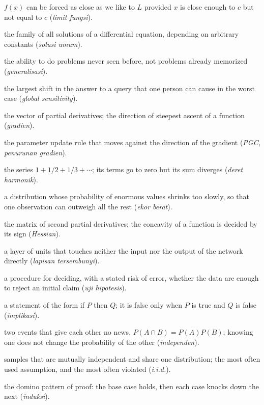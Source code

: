 \begin{description}[style=nextline,itemsep=0.35em]
  \item[Functional limit] $f(x)$ can be forced as close as we like to $L$ provided $x$ is close enough to $c$ but not equal to $c$ (\emph{limit fungsi}).
  \item[General solution] the family of all solutions of a differential equation, depending on arbitrary constants (\emph{solusi umum}).
  \item[Generalization] the ability to do problems never seen before, not problems already memorized (\emph{generalisasi}).
  \item[Global sensitivity] the largest shift in the answer to a query that one person can cause in the worst case (\emph{global sensitivity}).
  \item[Gradient] the vector of partial derivatives; the direction of steepest ascent of a function (\emph{gradien}).
  \item[Gradient descent] the parameter update rule that moves against the direction of the gradient (\emph{PGC, penurunan gradien}).
  \item[Harmonic series] the series $1+1/2+1/3+\cdots$; its terms go to zero but its sum diverges (\emph{deret harmonik}).
  \item[Heavy tail] a distribution whose probability of enormous values shrinks too slowly, so that one observation can outweigh all the rest (\emph{ekor berat}).
  \item[Hessian] the matrix of second partial derivatives; the concavity of a function is decided by its sign (\emph{Hessian}).
  \item[Hidden layer] a layer of units that touches neither the input nor the output of the network directly (\emph{lapisan tersembunyi}).
  \item[Hypothesis test] a procedure for deciding, with a stated risk of error, whether the data are enough to reject an initial claim (\emph{uji hipotesis}).
  \item[Implication] a statement of the form if $P$ then $Q$; it is false only when $P$ is true and $Q$ is false (\emph{implikasi}).
  \item[Independent] two events that give each other no news, $P(A\cap B)=P(A)P(B)$; knowing one does not change the probability of the other (\emph{independen}).
  \item[Independent and identically distributed] samples that are mutually independent and share one distribution; the most often used assumption, and the most often violated (\emph{i.i.d.}).
  \item[Induction] the domino pattern of proof: the base case holds, then each case knocks down the next (\emph{induksi}).

\end{description}
